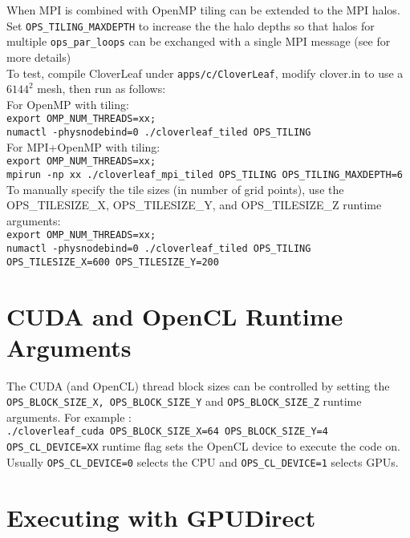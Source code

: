 \documentclass[11pt]{article}
\begin{document}
{When MPI is combined with OpenMP tiling can be extended to the MPI halos. 
Set \texttt{OPS\_TILING\_MAXDEPTH} to increase the the halo depths so that 
halos for multiple \texttt{ops\_par\_loops} can be exchanged with a 
single MPI message (see \cite{TPDS2017} for more details)\\

\noindent To test, compile CloverLeaf under \texttt{apps/c/CloverLeaf}, modify 
clover.in to use a $6144^2$ mesh, then run as follows: \\

\noindent For OpenMP with tiling:\\
\texttt{export OMP\_NUM\_THREADS=xx;\\
numactl -physnodebind=0 ./cloverleaf\_tiled OPS\_TILING}\\

\noindent For MPI+OpenMP with tiling:\\
\texttt{export OMP\_NUM\_THREADS=xx;\\
mpirun -np xx ./cloverleaf\_mpi\_tiled OPS\_TILING 
OPS\_TILING\_MAXDEPTH=6} \\

\noindent To manually specify the tile sizes (in number of grid points), use the 
OPS\_TILESIZE\_X, OPS\_TILESIZE\_Y, and OPS\_TILESIZE\_Z
runtime arguments:\\
\texttt{export OMP\_NUM\_THREADS=xx; \\
numactl -physnodebind=0 ./cloverleaf\_tiled OPS\_TILING OPS\_TILESIZE\_X=600 OPS\_TILESIZE\_Y=200
}

\section{CUDA and OpenCL Runtime Arguments}
\noindent The CUDA (and OpenCL) thread block sizes can be controlled by setting 
the \texttt{OPS\_BLOCK\_SIZE\_X, OPS\_BLOCK\_SIZE\_Y} and 
\texttt{OPS\_BLOCK\_SIZE\_Z} runtime arguments. For example :\\

\noindent\texttt{./cloverleaf\_cuda OPS\_BLOCK\_SIZE\_X=64 
OPS\_BLOCK\_SIZE\_Y=4}\\

\noindent \texttt{OPS\_CL\_DEVICE=XX} runtime flag sets the OpenCL device to 
execute the code on. \\Usually \texttt{OPS\_CL\_DEVICE=0} selects the CPU and 
\texttt{OPS\_CL\_DEVICE=1} selects GPUs. 

\section{Executing with GPUDirect}

}
\end{document}
